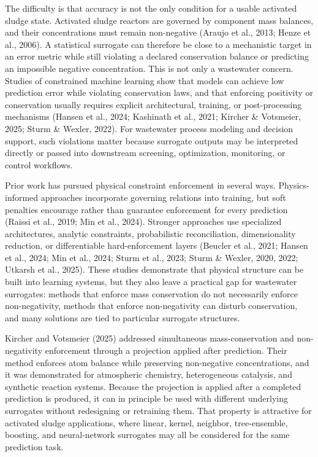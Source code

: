 \documentclass[a4paper,fleqn]{cas-sc}
\begin{document}
The difficulty is that accuracy is not the only condition for a usable activated sludge state. Activated sludge reactors are governed by component mass balances, and their concentrations must remain non-negative (Araujo et al., 2013; Henze et al., 2006). A statistical surrogate can therefore be close to a mechanistic target in an error metric while still violating a declared conservation balance or predicting an impossible negative concentration. This is not only a wastewater concern. Studies of constrained machine learning show that models can achieve low prediction error while violating conservation laws, and that enforcing positivity or conservation usually requires explicit architectural, training, or post-processing mechanisms (Hansen et al., 2024; Kashinath et al., 2021; Kircher \& Votsmeier, 2025; Sturm \& Wexler, 2022). For wastewater process modeling and decision support, such violations matter because surrogate outputs may be interpreted directly or passed into downstream screening, optimization, monitoring, or control workflows.

Prior work has pursued physical constraint enforcement in several ways. Physics-informed approaches incorporate governing relations into training, but soft penalties encourage rather than guarantee enforcement for every prediction (Raissi et al., 2019; Min et al., 2024). Stronger approaches use specialized architectures, analytic constraints, probabilistic reconciliation, dimensionality reduction, or differentiable hard-enforcement layers (Beucler et al., 2021; Hansen et al., 2024; Min et al., 2024; Sturm et al., 2023; Sturm \& Wexler, 2020, 2022; Utkarsh et al., 2025). These studies demonstrate that physical structure can be built into learning systems, but they also leave a practical gap for wastewater surrogates: methods that enforce mass conservation do not necessarily enforce non-negativity, methods that enforce non-negativity can disturb conservation, and many solutions are tied to particular surrogate structures.

Kircher and Votsmeier (2025) addressed simultaneous mass-conservation and non-negativity enforcement through a projection applied after prediction. Their method enforces atom balance while preserving non-negative concentrations, and it was demonstrated for atmospheric chemistry, heterogeneous catalysis, and synthetic reaction systems. Because the projection is applied after a completed prediction is produced, it can in principle be used with different underlying surrogates without redesigning or retraining them. That property is attractive for activated sludge applications, where linear, kernel, neighbor, tree-ensemble, boosting, and neural-network surrogates may all be considered for the same prediction task.
\end{document}
